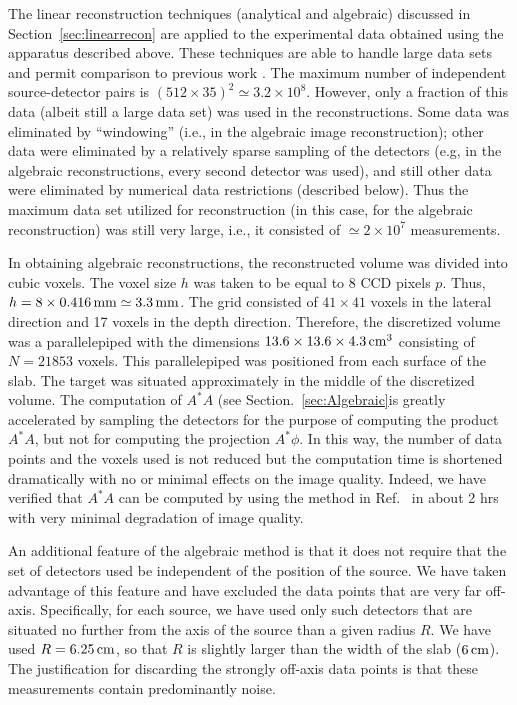 The linear reconstruction techniques (analytical and algebraic) discussed in Section~\ref{sec:linearrecon} are applied to the experimental data obtained using the apparatus described above. These techniques are able to handle large data sets and permit comparison to previous work \cite{Konecky2008a}. The maximum number of independent source-detector pairs is $(512\times 35)^2\simeq 3.2\times 10^8$. However, only a fraction of this data (albeit still a large data set) was used in the reconstructions. Some data was eliminated by ``windowing'' (i.e., in the algebraic image reconstruction); other data were eliminated by a relatively sparse sampling of the detectors (e.g, in the algebraic reconstructions, every second detector was used), and still other data were eliminated by numerical data restrictions (described below). Thus the maximum data set utilized for reconstruction (in this case, for the algebraic reconstruction) was still very large, i.e., it consisted of $\simeq 2\times 10^7$ measurements.

In obtaining algebraic reconstructions, the reconstructed volume was divided into cubic voxels. The voxel size $h$ was taken to be equal to 8 CCD pixels $p$. Thus, $h=8\times 0.416\,{\rm mm}\simeq 3.3\,{\rm mm}$. The grid consisted of $41\times 41$ voxels in the lateral direction and 17 voxels in the depth direction. Therefore, the discretized volume was a parallelepiped with the dimensions $13.6\times 13.6\times 4.3\,{\rm cm}^3$ consisting of $N=21853$ voxels. This parallelepiped was positioned from each surface of the slab. The target was situated approximately in the middle of the discretized volume. The computation of $A^*A$ (see Section.~\ref{sec:Algebraic}is greatly accelerated by sampling the detectors for the purpose of computing the product $A^*A$, but not for computing the projection $A^*\phi$. In this way, the number of data points and the voxels used is not reduced but the computation time is shortened dramatically with no or minimal effects on the image quality. Indeed, we have verified that $A^*A$ can be computed by using the method in Ref.~\cite{Markel2005} in about 2 hrs with very minimal degradation of image quality.

An additional feature of the algebraic method is that it does not require that the set of detectors used be independent of the position of the source. We have taken advantage of this feature and have excluded the data points that are very far off-axis. Specifically, for each source, we have used only such detectors that are situated no further from the axis of the source than a given radius $R$. We have used $R=6.25\,{\rm cm}$, so that $R$ is slightly larger than the width of the slab ($6\,{\rm cm}$). The justification for discarding the strongly off-axis data points is that these measurements contain predominantly noise.

